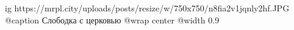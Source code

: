  
 
 
 
 

\ifcmt
  ig https://mrpl.city/uploads/posts/resize/w/750x750/n8fia2v1jqnly2hf.JPG
	@caption Слободка с церковью
  @wrap center
  @width 0.9
\fi
